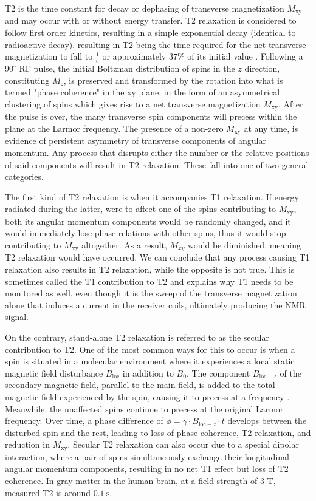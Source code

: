 T2 is the time constant for decay or dephasing of transverse magnetization $M_{\text{xy}}$ and may occur with or without energy transfer. T2 relaxation is considered to follow first order kinetics, resulting in a simple exponential decay (identical to radioactive decay), resulting in T2 being the time required for the net transverse magnetization to fall to $\frac{1}{e}$ or approximately $37\%$ of its initial value \cite{T2}. Following a $90^\circ$ \gls{RF} pulse, the initial Boltzman distribution of spins in the $z$ direction, constituting $M_z$, is preserved and transformed by the rotation into what is termed "phase coherence" in the $\text{xy}$ plane, in the form of an asymmetrical clustering of spins which gives rise to a net transverse magnetization $M_{\text{xy}}$. After the pulse is over, the many transverse spin components will precess within the plane at the Larmor frequency. The presence of a non-zero $M_{\text{xy}}$ at any time, is evidence of persistent asymmetry of transverse components of angular momentum. Any process that disrupts either the number or the relative positions of said components will result in T2 relaxation. These fall into one of two general categories.

The first kind of T2 relaxation is when it accompanies T1 relaxation. If energy radiated during the latter, were to affect one of the spins contributing to $M_{\text{xy}}$, both its angular momentum components would be randomly changed, and it would immediately lose phase relations with other spins, thus it would stop contributing to $M_{\text{xy}}$ altogether. As a result, $M_{xy}$ would be diminished, meaning T2 relaxation would have occurred. We can conclude that any process causing T1 relaxation also results in T2 relaxation, while the opposite is not true. This is sometimes called the T1 contribution to T2 and explains why T1 needs to be monitored as well, even though it is the sweep of the transverse magnetization alone that induces a current in the receiver coils, ultimately producing the \gls{NMR} signal.

On the contrary, stand-alone T2 relaxation is referred to as the secular contribution to T2. One of the most common ways for this to occur is when a spin is situated in a molecular environment where it experiences a local static magnetic field disturbance \( B_{\text{loc}} \) in addition to \( B_0 \). The component \( B_{\text{loc}-z} \) of the secondary magnetic field, parallel to the main field, is added to the total magnetic field experienced by the spin, causing it to precess at a frequency . Meanwhile, the unaffected spins continue to precess at the original Larmor frequency. Over time, a phase difference of \( \phi = \gamma \cdot B_{\text{loc}-z} \cdot t \) develops between the disturbed spin and the rest, leading to loss of phase coherence, T2 relaxation, and reduction in \( M_{\text{xy}} \). Secular T2 relaxation can also occur due to a special dipolar interaction, where a pair of spins simultaneously exchange their longitudinal angular momentum components, resulting in no net T1 effect but loss of T2 coherence. In gray matter in the human brain, at a field strength of 3 \si{\tesla}, measured T2 is around \( \SI{0.1}{\second} \).

